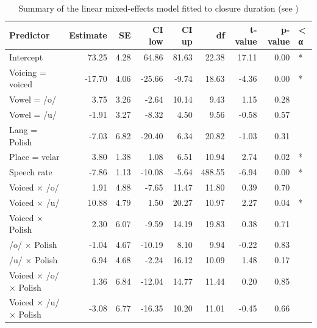 \documentclass[charis]{glossa}
\begin{document}
\begin{table}[t]

\caption{\label{tab:clo-table}Summary of the linear mixed-effects model fitted to closure duration (see )}
\centering
\fontsize{8}{10}\selectfont
\begin{tabular}{lrrrrrrrl}
\toprule
Predictor & Estimate & SE & CI low & CI up & df & t-value & p-value & < α\\
\midrule
Intercept & 73.25 & 4.28 & 64.86 & 81.63 & 22.38 & 17.11 & 0.00 & *\\
Voicing = voiced & -17.70 & 4.06 & -25.66 & -9.74 & 18.63 & -4.36 & 0.00 & *\\
Vowel = /o/ & 3.75 & 3.26 & -2.64 & 10.14 & 9.43 & 1.15 & 0.28 & \\
Vowel = /u/ & -1.91 & 3.27 & -8.32 & 4.50 & 9.56 & -0.58 & 0.57 & \\
Lang = Polish & -7.03 & 6.82 & -20.40 & 6.34 & 20.82 & -1.03 & 0.31 & \\
Place = velar & 3.80 & 1.38 & 1.08 & 6.51 & 10.94 & 2.74 & 0.02 & *\\
Speech rate & -7.86 & 1.13 & -10.08 & -5.64 & 488.55 & -6.94 & 0.00 & *\\
Voiced × /o/ & 1.91 & 4.88 & -7.65 & 11.47 & 11.80 & 0.39 & 0.70 & \\
Voiced × /u/ & 10.88 & 4.79 & 1.50 & 20.27 & 10.97 & 2.27 & 0.04 & *\\
Voiced × Polish & 2.30 & 6.07 & -9.59 & 14.19 & 19.83 & 0.38 & 0.71 & \\
/o/ × Polish & -1.04 & 4.67 & -10.19 & 8.10 & 9.94 & -0.22 & 0.83 & \\
/u/ × Polish & 6.94 & 4.68 & -2.24 & 16.12 & 10.09 & 1.48 & 0.17 & \\
Voiced × /o/ × Polish & 1.36 & 6.84 & -12.04 & 14.77 & 11.44 & 0.20 & 0.85 & \\
Voiced × /u/ × Polish & -3.08 & 6.77 & -16.35 & 10.20 & 11.01 & -0.45 & 0.66 & \\
\bottomrule
\end{tabular}
\end{table}
\end{document}
